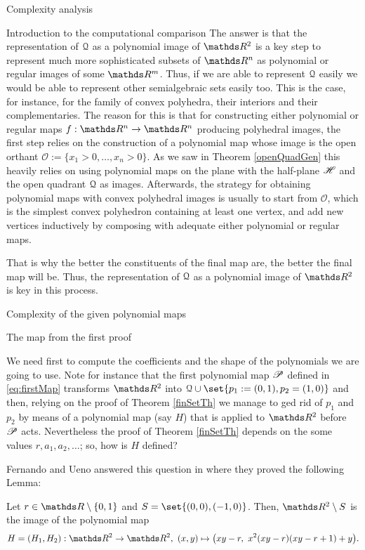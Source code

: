 \documentclass[11pt, a4paper, english, twoside, notitlepage, openright]{report}
\begin{document}
\begin{chapter}{Complexity analysis}
\begin{section}{Introduction to the computational comparison}
The answer is that the representation of $\Qu$ as a polynomial image of $\R^2$ is a key step to represent much more sophisticated subsets of $\R^n$ as polynomial or regular images of some $\R^m$. Thus, if we are able to represent $\Qu$ easily we would be able to represent other semialgebraic sets easily too. This is the case, for instance, for the family  of convex polyhedra, their interiors and their complementaries. The reason for this is that for constructing either polynomial or regular maps $f:\R^n\to\R^n$ producing polyhedral images, the first step relies on the construction of a polynomial map whose image is the open orthant $\mathscr{O}:=\{x_1>0,\dots,x_n>0\}$. As we saw in Theorem \ref{openQuadGen} this heavily relies on using polynomial maps on the plane with the half-plane $\H$ and the open quadrant $\Qu$ as images. Afterwards, the strategy for obtaining polynomial maps with convex polyhedral images is usually to start from $\mathscr{O}$, which is the simplest convex polyhedron containing at least one vertex, and add new vertices inductively by composing with adequate either polynomial or regular maps.

That is why the better the constituents of the final map are, the better the final map will be.  Thus, the representation of $\Qu$ as a polynomial image of $\R^2$ is key in this process.	
\end{section}

\begin{section}{Complexity of the given polynomial maps}\label{5sect2}

\begin{subsection}{The map from the first proof}

We need first to compute the coefficients and the shape of the polynomials we are going to use. Note for instance that the first polynomial map $\P$ defined in \ref{eq:firstMap} transforms $\R^2$ into $\Qu\cup\set{p_1:=(0,1),p_2=(1,0)}$ and then, relying on the proof of Theorem \ref{finSetTh} we manage to ged rid of $p_1$ and $p_2$ by means of a polynomial map (say $H$) that is applied to $\R^2$ before $\P$ acts. Nevertheless the proof of Theorem \ref{finSetTh} depends on the some values $r,a_1,a_2,\dots$; so, how is $H$ defined?

Fernando and Ueno answered this question in \cite{fu1} where they proved the following Lemma:

\begin{lemma}
Let $r\in\R\setminus\{0,1\}$ and $S=\set{(0,0),(-1,0)}$. Then, $\R^2\setminus S$ is the image of the polynomial map 
$$
H=(H_1,H_2):\R^2\to\R^2,\ (x,y)\mapsto\big(xy-r,\ x^2(xy-r)(xy-r+1)+y\big).
$$	
\end{lemma}


\end{subsection}
\end{section}
\end{chapter}
\end{document}
